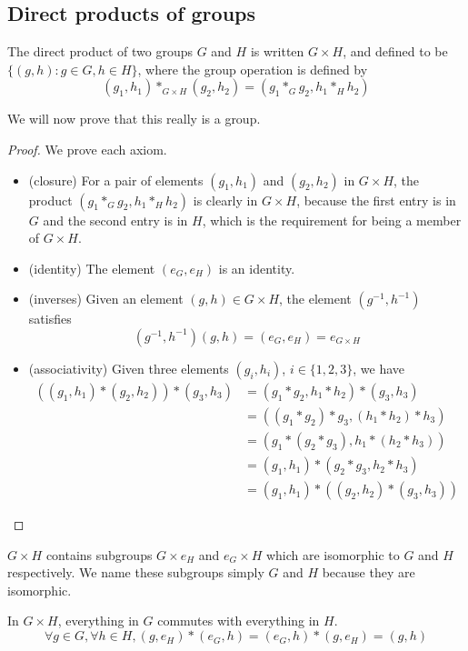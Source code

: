 \subsection{Direct products of groups}
\begin{definition}
	The direct product of two groups \(G\) and \(H\) is written \(G \times H\), and defined to be \(\{ (g, h) : g \in G, h \in H \}\), where the group operation is defined by
	\[
		(g_1, h_1) \ast_{G \times H} (g_2, h_2) = (g_1 \ast_G g_2, h_1 \ast_H h_2)
	\]
\end{definition}
We will now prove that this really is a group.
\begin{proof}
	We prove each axiom.
	\begin{itemize}
		\item (closure) For a pair of elements \((g_1, h_1)\) and \((g_2, h_2)\) in \(G \times H\), the product \((g_1 \ast_G g_2, h_1 \ast_H h_2)\) is clearly in \(G \times H\), because the first entry is in \(G\) and the second entry is in \(H\), which is the requirement for being a member of \(G \times H\).
		\item (identity) The element \((e_G, e_H)\) is an identity.
		\item (inverses) Given an element \((g, h) \in G \times H\), the element \((g^{-1}, h^{-1})\) satisfies
		\[(g^{-1}, h^{-1})(g, h) = (e_G, e_H) = e_{G \times H}\]
		\item (associativity) Given three elements \((g_i, h_i)\), \(i \in \{1, 2, 3\}\), we have
		      \begin{align*}
			      ((g_1, h_1) \ast (g_2, h_2)) \ast (g_3, h_3) & = (g_1 \ast g_2, h_1 \ast h_2) \ast (g_3, h_3)       \\
			                                                   & = ((g_1 \ast g_2) \ast g_3, (h_1 \ast h_2) \ast h_3) \\
			                                                   & = (g_1 \ast (g_2 \ast g_3), h_1 \ast (h_2 \ast h_3)) \\
			                                                   & = (g_1, h_1) \ast (g_2 \ast g_3, h_2 \ast h_3)       \\
			                                                   & = (g_1, h_1) \ast ((g_2, h_2) \ast (g_3, h_3))
		      \end{align*}
	\end{itemize}
\end{proof}
\(G \times H\) contains subgroups \(G \times {e_H}\) and \({e_G} \times H\) which are isomorphic to \(G\) and \(H\) respectively.
We name these subgroups simply \(G\) and \(H\) because they are isomorphic.
\begin{note}
	In \(G \times H\), everything in \(G\) commutes with everything in \(H\).
	\[
		\forall g \in G, \forall h \in H, (g, e_H) \ast (e_G, h) = (e_G, h) \ast (g, e_H) = (g, h)
	\]
\end{note}

